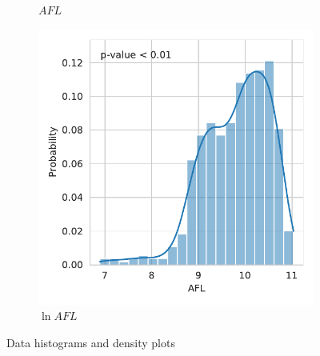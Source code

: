 \documentclass[12pt,a4paper]{article}
\begin{document}
\begin{figure}[htbp]
\begin{subfigure}{0.45\textwidth}
\caption{$AFL$}
\end{subfigure}
\begin{subfigure}{0.45\textwidth}
\includegraphics[width=\textwidth]{./plots/dis/distplot_lnAFL.pdf}
\caption{$\ln AFL$}
\end{subfigure}
\caption{Data histograms and density plots}
\label{fig:data_dists}
\end{figure}
\end{document}
